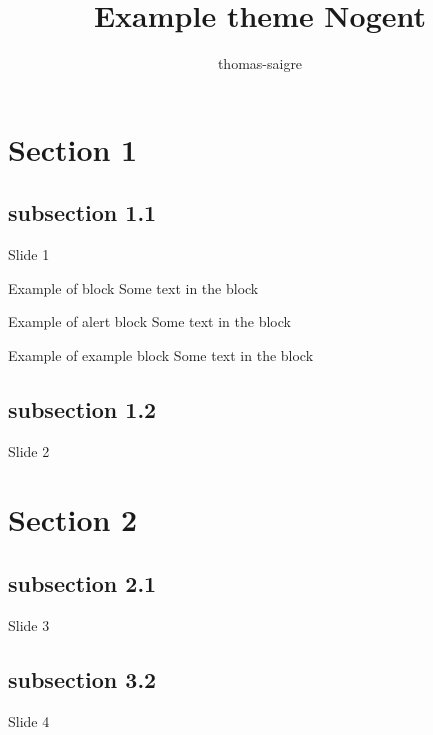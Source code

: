 \documentclass{beamer}
\author{thomas-saigre}
\title{Example theme Nogent}
\begin{document}
\section{Section 1}

\subsection{subsection 1.1}

\begin{frame}{Slide 1}
    \begin{block}{Example of block}
        Some text in the block
    \end{block}

    \begin{alertblock}{Example of alert block}
        Some text in the block
    \end{alertblock}

    \begin{exampleblock}{Example of example block}
        Some text in the block
    \end{exampleblock}

\end{frame}

\subsection{subsection 1.2}

\begin{frame}{Slide 2}
    \lipsum[2]
\end{frame}

\section{Section 2}

\subsection{subsection 2.1}

\begin{frame}{Slide 3}
    \label{label}
    \lipsum[3]
\end{frame}

\subsection{subsection 3.2}

\begin{frame}{Slide 4}
    \lipsum[4]
\end{frame}
\end{document}
